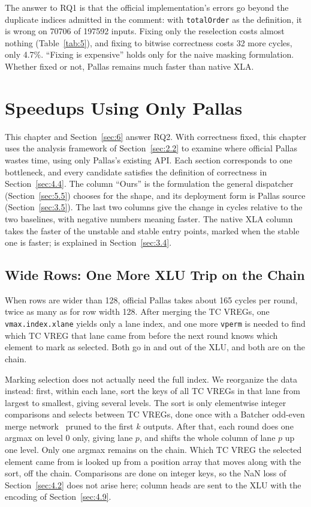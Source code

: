 \documentclass[sigconf,nonacm,balance=false]{acmart}
\newcommand{\code}[1]{\texttt{#1}}
\begin{document}
The answer to RQ1 is that the official implementation's errors go beyond the duplicate indices admitted in the comment: with \code{total\allowbreak{}Order} as the definition, it is wrong on 70706 of 197592 inputs. Fixing only the reselection costs almost nothing (Table~\ref{tab:5}), and fixing to bitwise correctness costs 32 more cycles, only 4.7\%. ``Fixing is expensive'' holds only for the naive masking formulation. Whether fixed or not, Pallas remains much faster than native XLA.

\section{Speedups Using Only Pallas}
\label{sec:5}

This chapter and Section~\ref{sec:6} answer RQ2. With correctness fixed, this chapter uses the analysis framework of Section~\ref{sec:2.2} to examine where official Pallas wastes time, using only Pallas's existing API. Each section corresponds to one bottleneck, and every candidate satisfies the definition of correctness in Section~\ref{sec:4.4}. The column ``Ours'' is the formulation the general dispatcher (Section~\ref{sec:5.5}) chooses for the shape, and its deployment form is Pallas source (Section~\ref{sec:3.5}). The last two columns give the change in cycles relative to the two baselines, with negative numbers meaning faster. The native XLA column takes the faster of the unstable and stable entry points, marked \dag{} when the stable one is faster; \ddag{} is explained in Section~\ref{sec:3.4}.

\subsection{Wide Rows: One More XLU Trip on the Chain}
\label{sec:5.1}

When rows are wider than 128, official Pallas takes about 165 cycles per round, twice as many as for row width 128. After merging the TC VREGs, one \code{vmax.\allowbreak{}index.\allowbreak{}xlane} yields only a lane index, and one more \code{vperm} is needed to find which TC VREG that lane came from before the next round knows which element to mark as selected. Both go in and out of the XLU, and both are on the chain.

Marking selection does not actually need the full index. We reorganize the data instead: first, within each lane, sort the keys of all TC VREGs in that lane from largest to smallest, giving several levels. The sort is only elementwise integer comparisons and selects between TC VREGs, done once with a Batcher odd-even merge network~\cite{batcher1968} pruned to the first $k$ outputs. After that, each round does one argmax on level 0 only, giving lane $p$, and shifts the whole column of lane $p$ up one level. Only one argmax remains on the chain. Which TC VREG the selected element came from is looked up from a position array that moves along with the sort, off the chain. Comparisons are done on integer keys, so the NaN loss of Section~\ref{sec:4.2} does not arise here; column heads are sent to the XLU with the encoding of Section~\ref{sec:4.9}.
\end{document}
